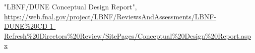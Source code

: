 \begin{thebibliography}{99}

%

%
%

%
%


%
%

%
%


%
%


%
%


%
%



 "LBNF/DUNE Conceptual Design Report",  \url{https://web.fnal.gov/project/LBNF/ReviewsAndAssessments/LBNF-DUNE\%20CD-1-Refresh\%20Directors\%20Review/SitePages/Conceptual\%20Design\%20Report.aspx}





\end{thebibliography}
